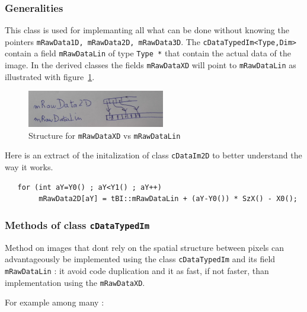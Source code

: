 
\subsubsection{Generalities}

This class is used for  implemanting all what can be done without
knowing the pointers {\tt mRawData1D, mRawData2D, mRawData3D}.
The  {\tt cDataTypedIm<Type,Dim>}  contain a field {\tt mRawDataLin} of
type {\tt Type *}  that contain the actual data of the image.
In the derived classes the fields {\tt mRawDataXD} will point
to {\tt mRawDataLin} as illustrated with figure~\ref{fig:Ptr2D}.




\begin{figure}
\centering
\includegraphics[width=6cm]{Programmer/ImagesProg/PtrIm2D.jpg}
\caption{Structure for {\tt mRawDataXD} vs {\tt mRawDataLin}}
\label{fig:Ptr2D}
\end{figure}

Here is an extract of the initalization of class {\tt cDataIm2D} to better understand
the way it works.


\lstset {language=C++}
\begin{lstlisting}
   for (int aY=Y0() ; aY<Y1() ; aY++)
        mRawData2D[aY] = tBI::mRawDataLin + (aY-Y0()) * SzX() - X0();
\end{lstlisting}



\subsubsection{Methods of class {\tt cDataTypedIm}}

Method  on images that dont rely on the spatial structure between pixels can  advantageously
be implemented using the class {\tt cDataTypedIm} and its field {\tt mRawDataLin} :
it avoid code duplication  and it as fast, if not faster, than implementation using
the {\tt mRawDataXD}. 

For example among many :

